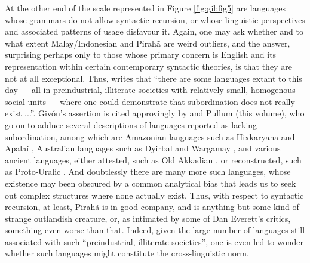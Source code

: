 \documentclass[output=paper,colorlinks,citecolor=brown
]{langscibook}
\begin{document}
At the other end of the scale represented in Figure \ref{fig:gil:fig5} are languages whose grammars do not allow syntactic recursion, or whose linguistic perspectives and associated patterns of usage disfavour it.  Again, one may ask whether and to what extent Malay/Indonesian and Pirahã are weird outliers, and the answer, surprising perhaps only to those whose primary concern is English and its representation within certain contemporary syntactic theories, is that they are not at all exceptional.  Thus, \citet[298]{givon1979understanding} writes that ``there are some languages extant to this day — all in preindustrial, illiterate societies with relatively small, homogenous social units — where one could demonstrate that subordination does not really exist ...''.  Givón's assertion is cited approvingly by \citet{pullum2010recursion} and Pullum (this volume), who go on to adduce several descriptions of languages reported as lacking subordination, among which are Amazonian languages such as Hixkaryana
\citep{derbyshire1979hixkaryana} and Apalaí \citep{koehn1986apalai}, Australian languages such as Dyirbal \citep{dixon1972dyirbal} and Wargamay \citep{dixon1981wargamay}, and various ancient languages, either attested, such as Old Akkadian \citep{deutscher2000syntactic}, or reconstructed, such as Proto-Uralic \citep{collinder1960comparative}.  And doubtlessly there are many more such languages, whose existence may been obscured by a common analytical bias that leads us to seek out complex structures where none actually exist.  Thus, with respect to syntactic recursion, at least, Pirahã is in good company, and is anything but some kind of strange outlandish creature, or, as intimated by some of Dan Everett's critics, something even worse than that.  Indeed, given the large number of languages still associated with such ``preindustrial, illiterate societies'', one is even led to wonder whether such languages might constitute the cross-linguistic norm.
\end{document}
